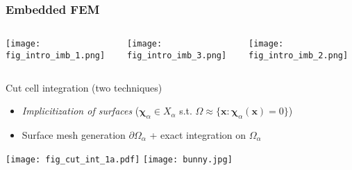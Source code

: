 \begin{frame}
\frametitle{ Embedded FEM }


\begin{columns}[onlytextwidth,t]


\centering

\texttt{[image: fig\_intro\_imb\_1.png]}


\centering

\texttt{[image: fig\_intro\_imb\_3.png]}



\centering

\texttt{[image: fig\_intro\_imb\_2.png]}


\vspace{1em}


\end{columns}

\begin{overprint}
\begin{block}{Cut cell integration (two techniques)}
  \vspace{0.2cm}
\begin{itemize}
  \item \emph{Implicitization of surfaces}  ($\boldsymbol{\chi}_\alpha \in X_\alpha$ s.t. $\Omega \approx \{ \boldsymbol{x} : \boldsymbol{\chi}_\alpha(\boldsymbol{x}) = 0 \}$)
  \item Surface mesh generation $\partial \Omega_\alpha$ + exact integration on $\Omega_\alpha$
\end{itemize}



\end{block}


  \begin{center}
 \texttt{[image: fig\_cut\_int\_1a.pdf]}\hspace*{2em}
  \hspace*{2em}
  \texttt{[image: bunny.jpg]}
\end{center}



\end{overprint}
\end{frame}
